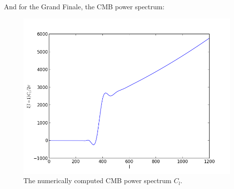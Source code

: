 \documentclass[norsk,a4paper,12pt]{article}
\begin{document}
And for the Grand Finale, the CMB power spectrum:


\begin{figure}[H] 
\begin{center} 
\includegraphics[scale=0.5]{cl.png} 
 

\caption{The numerically computed CMB power spectrum $C_l$.} 
\end{center} 
\end{figure}
\end{document}
